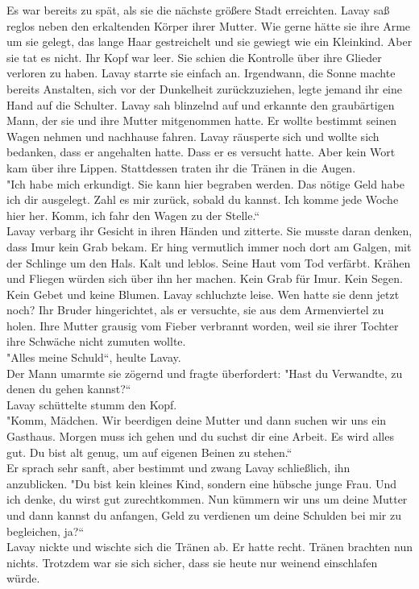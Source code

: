 Es war bereits zu spät, als sie die nächste größere Stadt erreichten. Lavay saß reglos neben den 
erkaltenden Körper ihrer Mutter. Wie gerne hätte sie ihre Arme um sie gelegt, das lange Haar 
gestreichelt und sie gewiegt wie ein Kleinkind. Aber sie tat es nicht. Ihr Kopf war leer. Sie 
schien die Kontrolle über ihre Glieder verloren zu haben. Lavay starrte sie einfach an.
Irgendwann, die Sonne machte bereits Anstalten, sich vor der Dunkelheit zurückzuziehen, legte 
jemand ihr eine Hand auf die Schulter. Lavay sah blinzelnd auf und erkannte den graubärtigen Mann, 
der sie und ihre Mutter mitgenommen hatte. Er wollte bestimmt seinen Wagen nehmen und nachhause 
fahren. Lavay räusperte sich und wollte sich bedanken, dass er angehalten hatte. Dass er es 
versucht hatte. Aber kein Wort kam über ihre Lippen. Stattdessen traten ihr die Tränen in die 
Augen.\\
"Ich habe mich erkundigt. Sie kann hier begraben werden. Das nötige Geld habe ich dir ausgelegt. 
Zahl es mir zurück, sobald du kannst. Ich komme jede Woche hier her. Komm, ich fahr den Wagen zu 
der Stelle.``\\
Lavay verbarg ihr Gesicht in ihren Händen und zitterte. Sie musste daran denken, dass Imur kein 
Grab bekam. Er hing vermutlich immer noch dort am Galgen, mit der Schlinge um den Hals. Kalt und 
leblos. Seine Haut vom Tod verfärbt. Krähen und Fliegen würden sich über ihn her machen. Kein Grab 
für Imur. Kein Segen. Kein Gebet und keine Blumen. Lavay schluchzte leise. Wen hatte sie denn jetzt 
noch? Ihr Bruder hingerichtet, als er versuchte, sie aus dem Armenviertel zu holen. Ihre Mutter 
grausig vom Fieber verbrannt worden, weil sie ihrer Tochter ihre Schwäche nicht zumuten wollte.\\
"Alles meine Schuld``, heulte Lavay.\\
Der Mann umarmte sie zögernd und fragte überfordert: "Hast du Verwandte, zu denen du gehen 
kannst?``\\
Lavay schüttelte stumm den Kopf. \\
"Komm, Mädchen. Wir beerdigen deine Mutter und dann suchen wir uns ein Gasthaus. Morgen muss ich 
gehen und du suchst dir eine Arbeit. Es wird alles gut. Du bist alt genug, um auf eigenen Beinen zu 
stehen.``\\
Er sprach sehr sanft, aber bestimmt und zwang Lavay schließlich, ihn anzublicken. "Du bist kein 
kleines Kind, sondern eine hübsche junge Frau. Und ich denke, du wirst gut zurechtkommen. Nun 
kümmern wir uns um deine Mutter und dann kannst du anfangen, Geld zu verdienen um deine Schulden 
bei mir zu begleichen, ja?``\\
Lavay nickte und wischte sich die Tränen ab. Er hatte recht. Tränen brachten nun nichts. Trotzdem 
war sie sich sicher, dass sie heute nur weinend einschlafen würde.\\



